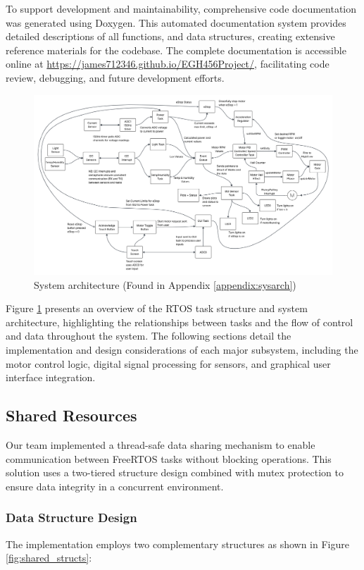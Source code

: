 \documentclass[a4paper, 11pt, titlepage]{article}
\begin{document}
To support development and maintainability, comprehensive code documentation was generated using Doxygen. This automated documentation system provides detailed descriptions of all functions, and data structures, creating extensive reference materials for the codebase. The complete documentation is accessible online at \url{https://james712346.github.io/EGH456Project/}, facilitating code review, debugging, and future development efforts.\\

\begin{figure}[h!]
    \center
    \includegraphics[width=0.7\linewidth]{images/systemArch.png}
    \caption{System architecture (Found in Appendix \ref{appendix:sysarch})}
    \label{fig:sysarch}
\end{figure}

Figure \ref{fig:sysarch} presents an overview of the RTOS task structure and system architecture, highlighting the relationships between tasks and the flow of control and data throughout the system. The following sections detail the implementation and design considerations of each major subsystem, including the motor control logic, digital signal processing for sensors, and graphical user interface integration.\\



\subsection{Shared Resources}
Our team implemented a thread-safe data sharing mechanism to enable communication between FreeRTOS tasks without blocking operations. This solution uses a two-tiered structure design combined with mutex protection to ensure data integrity in a concurrent environment.

\subsubsection{Data Structure Design}
The implementation employs two complementary structures as shown in Figure \ref{fig:shared_structs}:
\end{document}
